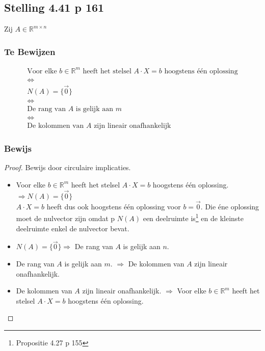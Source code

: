 \documentclass[lineaire_algebra_oplossingen.tex]{subfiles}
\begin{document}
\subsection{Stelling 4.41 p 161}
\label{4.41}
Zij $A \in \mathbb{R}^{m\times n}$

\subsubsection*{Te Bewijzen}
\begin{gather*}
\text{Voor elke $b \in \mathbb{R}^m$ heeft het stelsel $A\cdot X = b$ hoogstens \'e\'en oplossing} \\
\Leftrightarrow \\
N(A) = \{\vec{0}\} \\
\Leftrightarrow \\
\text{De rang van $A$ is gelijk aan $m$} \\
\Leftrightarrow \\
\text{De kolommen van $A$ zijn lineair onafhankelijk}
\end{gather*}

\subsubsection*{Bewijs}
\begin{proof}
Bewijs door circulaire implicaties.
\begin{itemize}
\item
Voor elke $b \in \mathbb{R}^m$ heeft het stelsel $A\cdot X = b$ hoogstens \'e\'en oplossing.
 $\Rightarrow N(A) = \{\vec{0}\}$\\
$A\cdot X = b$ heeft dus ook hoogstens \'e\'en oplossing voor $b = \vec{0}$. Die \'ene oplossing moet de nulvector zijn omdat  p $N(A)$ een deelruimte is\footnote{Propositie 4.27 p 155} en de kleinste deelruimte enkel de nulvector bevat.

\item
$N(A) = \{\vec{0}\} \Rightarrow $ De rang van $A$ is gelijk aan $n$.


\item
De rang van $A$ is gelijk aan $m$. $\Rightarrow$ De kolommen van $A$ zijn lineair onafhankelijk.


\item
De kolommen van $A$ zijn lineair onafhankelijk. $\Rightarrow$ Voor elke $b \in \mathbb{R}^m$ heeft het stelsel $A\cdot X = b$ hoogstens \'e\'en oplossing.

\end{itemize}
\end{proof}
\end{document}
